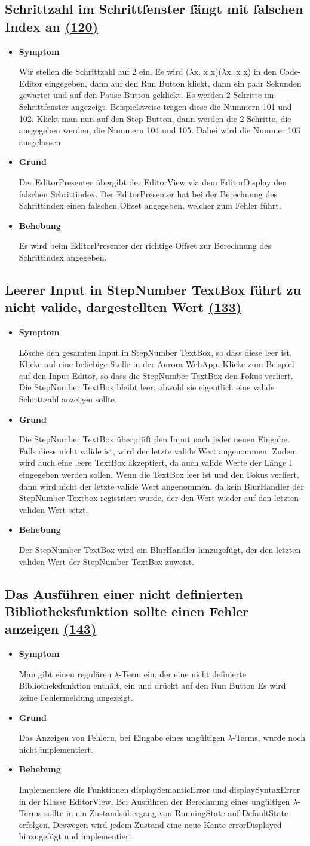 \documentclass[parskip=full,11pt,twoside]{scrartcl}
\newcommand{\issueref}[1]{
    \href{https://git.scc.kit.edu/ap/Aurora/issues/#1}{(#1)}
}
\newcommand{\regrtest}[5]{
    \subsection{#1 \issueref{#2}}
    \begin{itemize}
        \item \textbf{Symptom}
            #3
        \item \textbf{Grund}
            #4
        \item \textbf{Behebung}
            #5
    \end{itemize}
}
\begin{document}
    
    \regrtest{Schrittzahl im Schrittfenster fängt mit falschen Index an}{120}{
    	Wir stellen die Schrittzahl auf 2 ein.
		Es wird ($\lambda$x. x x)($\lambda$x. x x) in den Code-Editor eingegeben,  
		dann auf den Run Button klickt, dann ein paar Sekunden gewartet und auf den Pause-Button geklickt. Es werden 2 Schritte im Schrittfenster angezeigt. Beispielsweise tragen diese die Nummern 101 und 102.
		Klickt man nun auf den Step Button, dann werden die 2 Schritte, die ausgegeben werden, die Nummern 104 und 105.
		Dabei wird die Nummer 103 ausgelassen.
    }{
    	Der EditorPresenter übergibt der EditorView via dem EditorDisplay den falschen Schrittindex. 
		Der EditorPresenter hat bei der Berechnung des Schrittindex einen falschen Offset angegeben, welcher zum Fehler führt.
    }{
    	Es wird beim EditorPresenter der richtige Offset zur Berechnung des Schrittindex angegeben. 
    }
    
    \regrtest{Leerer Input in StepNumber TextBox führt zu nicht valide, dargestellten Wert}{133}{
        Lösche den gesamten Input in StepNumber TextBox, so dass diese leer ist. Klicke auf eine beliebige Stelle in der Aurora WebApp.
        Klicke zum Beispiel auf den Input Editor, so dass die StepNumber TextBox den Fokus verliert. Die StepNumber TextBox bleibt leer,
        obwohl sie eigentlich eine valide Schrittzahl anzeigen sollte.
    }{
        Die StepNumber TextBox überprüft den Input nach jeder neuen Eingabe. Falls diese nicht valide ist, wird der letzte valide Wert angenommen.
        Zudem wird auch eine leere TextBox akzeptiert, da auch valide Werte der Länge 1 eingegeben werden sollen. Wenn die TextBox leer ist und
        den Fokus verliert, dann wird nicht der letzte valide Wert angenommen, da kein BlurHandler der StepNumber Textbox registriert wurde, 
        der den Wert wieder auf den letzten validen Wert setzt.
    }{
        Der StepNumber TextBox wird ein BlurHandler hinzugefügt, der den letzten validen Wert der StepNumber TextBox zuweist.
    }
    
    \regrtest{Das Ausführen einer nicht definierten Bibliotheksfunktion sollte einen Fehler anzeigen}{143}{
    	Man gibt einen regulären $\lambda$-Term ein, der eine nicht definierte Bibliotheksfunktion enthält, ein und drückt auf den Run Button
		Es wird keine Fehlermeldung angezeigt.
    }{
    	Das Anzeigen von Fehlern, bei Eingabe eines ungültigen $\lambda$-Terms, 
		wurde noch nicht implementiert.
    }{
    	Implementiere die Funktionen displaySemanticError und displaySyntaxError in der Klasse EditorView.
		Bei Ausführen der Berechnung eines ungültigen $\lambda$-Terms sollte in ein Zustandsübergang von RunningState auf DefaultState erfolgen.
		Deswegen wird jedem Zustand eine neue Kante errorDisplayed hinzugefügt und implementiert.
    }
\end{document}
